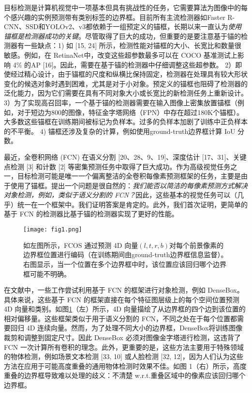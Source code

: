 \documentclass[../main.tex]{subfile}
\begin{document}
目标检测是计算机视觉中一项基本但具有挑战性的任务，它需要算法为图像中的每个感兴趣的实例预测带有类别标签的边界框。目前所有主流检测器如Faster R-CNN\cite{fasterrcnn}、SSD\cite{ssd}和YOLOv2、v3\cite{yolov3}都依赖于一组预定义的锚框，长期以来一直认为\textit{使用锚框是检测器成功的关键}。尽管取得了巨大的成功，但重要的是要注意基于锚的检测器有一些缺点：1) 如 [15, 24] 所示，检测性能对锚框的大小、长宽比和数量很敏感。例如，在 RetinaNet\cite{retinanet}中，改变这些超参数最多可以在 COCO 基准测试上影响 4\% 的AP [16]。因此，需要在基于锚的检测器中仔细调整这些超参数。 2）即使经过精心设计，由于锚框的尺度和纵横比保持固定，检测器在处理具有较大形状变化的候选对象时遇到困难，尤其是对于小对象。预定义的锚框也阻碍了检测器的泛化能力，因为它们需要在具有不同对象大小或长宽比的新检测任务上重新设计。 3）为了实现高召回率，一个基于锚的检测器需要在输入图像上密集放置锚框（例如，对于短边为800的图像，特征金字塔网络（FPN）\cite{fpn}中存在超过180K个锚框）。大多数这些锚框在训练期间被标记为负样本。过多的负样本加剧了训练中正负样本的不平衡。 4) 锚框还涉及复杂的计算，例如使用ground-truth边界框计算 IoU 分数。

最近，全卷积网络 (FCN) \cite{fcn} 在语义分割 [20、28、9、19]、深度估计 [17、31]、关键点检测 [3] 和计数 [2] 等密集预测任务中取得了巨大成功。作为高级视觉任务之一，目标检测可能是唯一一个偏离整洁的全卷积每像素预测框架的任务，主要是由于使用了锚框。提出一个问题是很自然的：\textit{我们能否以简洁的每像素预测方式解决对象检测，例如，类似于语义分割的 FCN？}因此，这些基本的视觉任务可以（几乎）统一在一个框架中。我们证明答案是肯定的。此外，我们首次证明，更简单的基于 FCN 的检测器比基于锚的检测器实现了更好的性能。

\begin{figure}[htb]
    \centering
    \texttt{[image: fig1.png]}
    \caption{如左图所示，FCOS 通过预测 4D 向量$\left(l,t,r,b\right)$对每个前景像素的边界框位置进行编码（在训练期间由ground-truth边界框信息监督）。 右图显示，当一个位置在多个边界框中时，该位置应该回归哪个边界框可能不明确。}
    \label{fig:fig1}
\end{figure}

在文献中，一些工作尝试利用基于 FCN 的框架进行对象检测，例如 DenseBox\cite{densebox}。具体来说，这些基于 FCN 的框架直接在每个特征图层级上的每个空间位置预测 4D 向量和类别。如图\ref{fig:fig1}（左）所示，4D 向量描绘了从边界框的四个边到该位置的相对偏移量。这些框架类似于用于语义分割的 FCN，不同之处在于每个位置都需要回归 4D 连续向量。然而，为了处理不同大小的边界框，DenseBox\cite{densebox}将训练图像裁剪和调整到固定尺寸。因此 DenseBox 必须对图像金字塔进行检测，这违背了 FCN 一次计算所有卷积的理念。此外，更重要的是，这些方法主要用于特殊领域的物体检测，例如场景文本检测 [33, 10] 或人脸检测 [32, 12]，因为人们认为这些方法在应用于可能高度重叠的通用物体检测时效果不佳。如图 1（右）所示，高度重叠的边界框导致难以处理的歧义：不清楚 w.r.t.重叠区域中的像素应该回归哪个边界框。
\end{document}
